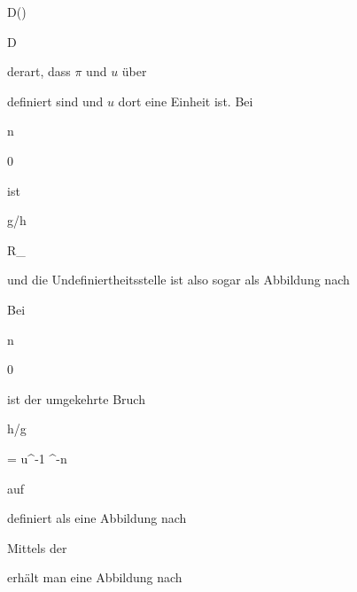 {{{ \in }{ D(\psi )
}

{ \subseteq }{ D
}

{    }{
}

{   }{
}

}
{}{}{}
derart, dass $\pi$ und $u$ über

 definiert sind und $u$ dort eine Einheit ist. Bei


\mavergleichskette

{\vergleichskette

{n
}

{ \geq }{ 0
}

{  }{
}

{    }{
}

{   }{
}

}
{}{}{}
ist


\mavergleichskette

{\vergleichskette

{ g/h
}

{ \in }{ R_\psi
}

{  }{
}

{    }{
}

{   }{
}

}
{}{}{}
und die Undefiniertheitsstelle ist also sogar als Abbildung nach

  Bei


\mavergleichskette

{\vergleichskette

{ n
}

{ \leq }{ 0
}

{  }{
}

{    }{
}

{   }{
}

}
{}{}{}
ist der umgekehrte Bruch


\mavergleichskette

{\vergleichskette

{ h/g
}

{ = }{ u^{-1} \pi^{-n}
}

{  }{
}

{    }{
}

{   }{
}

}
{}{}{}
auf

 definiert als eine Abbildung nach

 Mittels der 

 erhält man eine Abbildung nach

}
